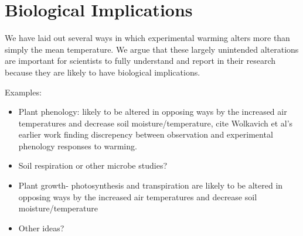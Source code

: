 \documentclass{article}
\begin{document}
\section {Biological Implications}
\par We have laid out several ways in which experimental warming alters more than
simply the mean temperature. We argue that these largely unintended alterations are important for scientists to fully understand and report in their research because they are likely to have biological implications. 
\par Examples:
\begin{itemize}
\item Plant phenology: likely to be altered in opposing ways by
the increased air temperatures and decrease soil moisture/temperature, cite Wolkavich et al's earlier work finding discrepency between observation and experimental phenology responses to warming.
\item Soil respiration or other microbe studies?
\item Plant growth- photosynthesis and transpiration are likely to be altered in opposing ways by the increased air temperatures and decrease soil moisture/temperature %
\item Other ideas?
\end{itemize}
\end{document}
